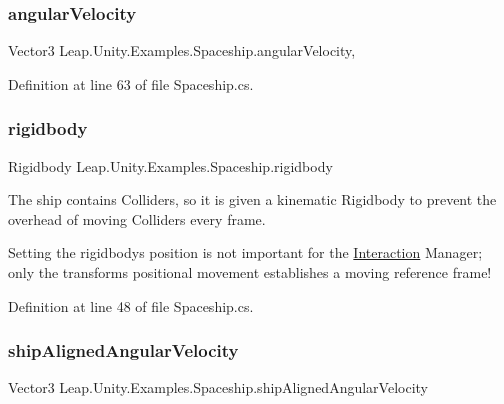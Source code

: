 \subsubsection{\texorpdfstring{angularVelocity}{angularVelocity}}
{\footnotesize\ttfamily Vector3 Leap.\+Unity.\+Examples.\+Spaceship.\+angular\+Velocity\hspace{0.3cm}{\ttfamily [get]}, {\ttfamily [set]}}



Definition at line 63 of file Spaceship.\+cs.

\mbox{\label{class_leap_1_1_unity_1_1_examples_1_1_spaceship_a1e2feb769d40fe69ee816294bea0c326}} 
\subsubsection{\texorpdfstring{rigidbody}{rigidbody}}
{\footnotesize\ttfamily Rigidbody Leap.\+Unity.\+Examples.\+Spaceship.\+rigidbody\hspace{0.3cm}{\ttfamily [get]}}



The ship contains Colliders, so it is given a kinematic Rigidbody to prevent the overhead of moving Colliders every frame. 

Setting the rigidbody\textquotesingle{}s position is not important for the \mbox{\hyperlink{namespace_leap_1_1_unity_1_1_interaction}{Interaction}} Manager; only the transform\textquotesingle{}s positional movement establishes a moving reference frame! 

Definition at line 48 of file Spaceship.\+cs.

\mbox{\label{class_leap_1_1_unity_1_1_examples_1_1_spaceship_a93b58eabd1710a71b7a087e274b9fa8c}} 
\subsubsection{\texorpdfstring{shipAlignedAngularVelocity}{shipAlignedAngularVelocity}}
{\footnotesize\ttfamily Vector3 Leap.\+Unity.\+Examples.\+Spaceship.\+ship\+Aligned\+Angular\+Velocity\hspace{0.3cm}{\ttfamily [get]}}



